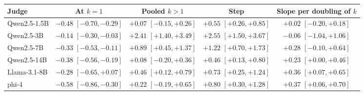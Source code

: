 \begin{tabular}{lcccc}
\toprule
Judge & At $k{=}1$ & Pooled $k{>}1$ & Step & Slope per doubling of $k$ \\
\midrule
Qwen2.5-1.5B & $-0.48$ {\scriptsize$[-0.70,-0.29]$} & $+0.07$ {\scriptsize$[-0.15,+0.26]$} & $+0.55$ {\scriptsize$[+0.26,+0.85]$} & $+0.02$ {\scriptsize$[-0.20,+0.18]$} \\
Qwen2.5-3B & $-0.14$ {\scriptsize$[-0.30,-0.03]$} & $+2.41$ {\scriptsize$[+1.40,+3.49]$} & $+2.55$ {\scriptsize$[+1.50,+3.67]$} & $-0.06$ {\scriptsize$[-1.04,+1.06]$} \\
Qwen2.5-7B & $-0.33$ {\scriptsize$[-0.53,-0.11]$} & $+0.89$ {\scriptsize$[+0.45,+1.37]$} & $+1.22$ {\scriptsize$[+0.70,+1.73]$} & $+0.28$ {\scriptsize$[-0.10,+0.64]$} \\
Qwen2.5-14B & $-0.38$ {\scriptsize$[-0.56,-0.19]$} & $+0.08$ {\scriptsize$[-0.20,+0.36]$} & $+0.46$ {\scriptsize$[+0.13,+0.80]$} & $+0.23$ {\scriptsize$[+0.00,+0.46]$} \\
Llama-3.1-8B & $-0.28$ {\scriptsize$[-0.65,+0.07]$} & $+0.46$ {\scriptsize$[+0.12,+0.79]$} & $+0.73$ {\scriptsize$[+0.25,+1.24]$} & $+0.36$ {\scriptsize$[+0.07,+0.65]$} \\
phi-4 & $-0.58$ {\scriptsize$[-0.86,-0.30]$} & $+0.22$ {\scriptsize$[-0.19,+0.65]$} & $+0.80$ {\scriptsize$[+0.30,+1.28]$} & $+0.37$ {\scriptsize$[+0.06,+0.70]$} \\
\bottomrule
\end{tabular}
